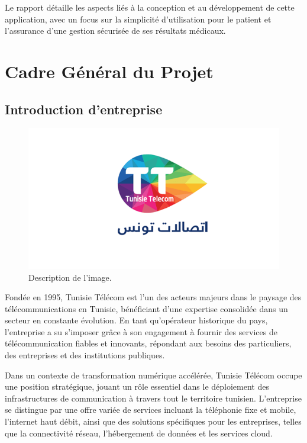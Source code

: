\documentclass[12pt,a4paper]{report}
\begin{document}
Le rapport détaille les aspects liés à la conception et au développement de cette application, avec un focus sur la simplicité d'utilisation pour le patient et l'assurance d'une gestion sécurisée de ses résultats médicaux.

\chapter{Cadre Général du Projet}


\section{Introduction d’entreprise }
\begin{figure}[h]
    \centering
    \includegraphics[width=\textwidth]{./img/tt.png}
    \caption{Description de l'image.}
\end{figure}

Fondée en 1995, Tunisie Télécom est l'un des acteurs majeurs dans le paysage des télécommunications en Tunisie, bénéficiant d’une expertise consolidée dans un secteur en constante évolution. En tant qu’opérateur historique du pays, l’entreprise a su s’imposer grâce à son engagement à fournir des services de télécommunication fiables et innovants, répondant aux besoins des particuliers, des entreprises et des institutions publiques.

Dans un contexte de transformation numérique accélérée, Tunisie Télécom occupe une position stratégique, jouant un rôle essentiel dans le déploiement des infrastructures de communication à travers tout le territoire tunisien. L’entreprise se distingue par une offre variée de services incluant la téléphonie fixe et mobile, l’internet haut débit, ainsi que des solutions spécifiques pour les entreprises, telles que la connectivité réseau, l’hébergement de données et les services cloud.
\end{document}
